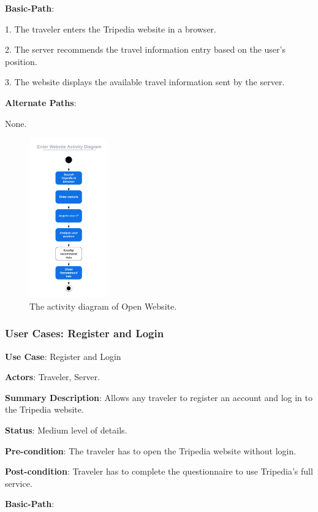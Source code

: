 \documentclass[conference]{IEEEtran}
\begin{document}
\textbf{Basic-Path}:

1. The traveler enters the Tripedia website in a browser.

2. The server recommends the travel information entry based on the user's position.

3. The website displays the available travel information sent by the server.

\textbf{Alternate Paths}:

None.

\begin{figure}[htbp]
\centerline{\includegraphics[width=0.3\textwidth]{activity_diagram_enter.pdf}}
\caption{The activity diagram of Open Website.}
\label{fig2}
\end{figure}


\subsubsection{User Cases: Register and Login}

\textbf{ }

\textbf{Use Case}: Register and Login

\textbf{Actors}: Traveler, Server.

\textbf{Summary Description}: Allows any traveler to register an account and log in to the Tripedia website.
 
\textbf{Status}: Medium level of details.

\textbf{Pre-condition}: The traveler has to open the Tripedia website without login.

\textbf{Post-condition}: Traveler has to complete the questionnaire to use Tripedia's full service.

\textbf{Basic-Path}:
\end{document}
